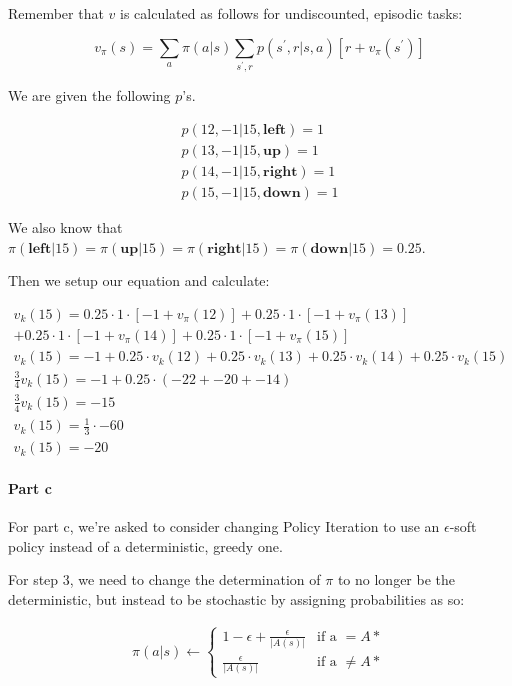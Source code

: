 \documentclass[12pt]{article}
\begin{document}
Remember that $v$ is calculated as follows for undiscounted, episodic tasks:

$$
  v_\pi(s) = \sum_a \pi(a | s) \sum_{s^\prime, r} p(s^\prime, r | s, a)[r + v_\pi(s^\prime)]
$$

We are given the following $p$'s.

\begin{gather*}
  p(12, -1 | 15, \textbf{left}) = 1 \\
  p(13, -1 | 15, \textbf{up}) = 1 \\
  p(14, -1 | 15, \textbf{right}) = 1 \\
  p(15, -1 | 15, \textbf{down}) = 1
\end{gather*}

We also know that $\pi(\textbf{left} | 15) = \pi(\textbf{up} | 15) = \pi(\textbf{right} | 15) = \pi(\textbf{down} | 15) = 0.25$.

Then we setup our equation and calculate:

\begin{gather*}
  v_k(15) = 0.25 \cdot 1 \cdot [-1 + v_\pi(12)] + 0.25 \cdot 1 \cdot [-1 + v_\pi(13)] \\
  + 0.25 \cdot 1 \cdot [-1 + v_\pi(14)] + 0.25 \cdot 1 \cdot [-1 + v_\pi(15)] \\
  v_k(15) = -1 + 0.25 \cdot v_k(12) + 0.25 \cdot v_k(13) + 0.25 \cdot v_k(14) + 0.25 \cdot v_k(15) \\
  \frac{3}{4} v_k(15) = -1 + 0.25 \cdot (-22 + -20 + -14) \\
  \frac{3}{4} v_k(15) = -15 \\
  v_k(15) = \frac{1}{3} \cdot -60 \\
  v_k(15) = -20
\end{gather*}

\paragraph{Part c} For part c, we're asked to consider changing Policy Iteration to use an $\epsilon$-soft policy instead of a deterministic, greedy one.

For step 3, we need to change the determination of $\pi$ to no longer be the deterministic, but instead to be stochastic by assigning probabilities as so:

\begin{gather*}
  \pi(a|s) \gets \begin{cases}
    1 - \epsilon + \frac{\epsilon}{|A(s)|} & \text{if a } = A*    \\
    \frac{\epsilon}{|A(s)|}                & \text{if a } \neq A*
  \end{cases}
\end{gather*}
\end{document}
